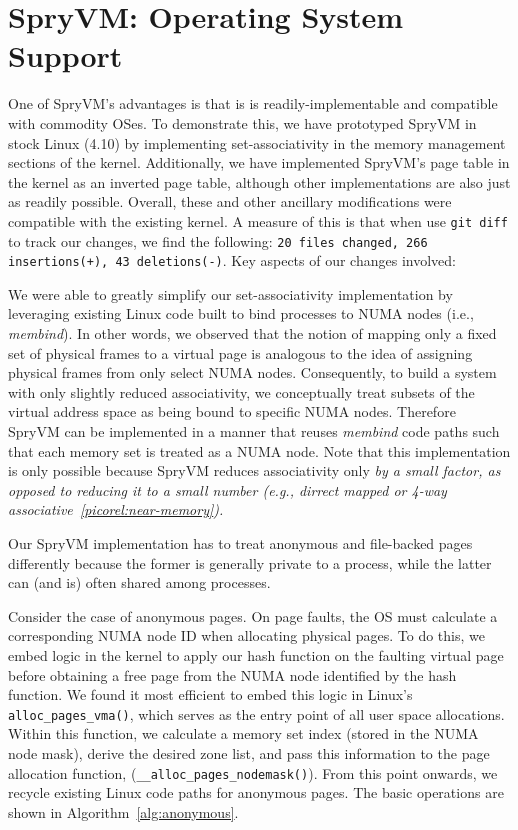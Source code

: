 \section{SpryVM: Operating System Support}
\label{sec:os}

One of SpryVM's advantages is that is is readily-implementable and
compatible with commodity OSes. To demonstrate this, we have
prototyped SpryVM in stock Linux (4.10) by implementing set-associativity in
the memory management sections of the kernel. Additionally, we have
implemented SpryVM's page table in the kernel as an inverted page table,
although other implementations are also just as readily possible. 
Overall, these and other ancillary
modifications were compatible with the existing kernel. A measure of
this is that when use \verb|git diff| to track our changes, we find
the following: \texttt{20 files changed, 266 insertions(+), 43
  deletions(-)}. Key aspects of our changes involved:

\vspace{2mm}
 We were
able to greatly simplify our set-associativity implementation by
leveraging existing Linux code built to bind processes to NUMA nodes
(i.e., {\it membind}). In other words, we observed that the notion of
mapping only a fixed set of physical frames to a virtual page is
analogous to the idea of assigning physical frames from only select
NUMA nodes. Consequently, to build a system with only slightly reduced associativity, 
we conceptually treat subsets of the virtual address space as being bound to specific
NUMA nodes. Therefore SpryVM can be implemented in a manner that
reuses {\it membind} code paths such that each memory set is treated
as a NUMA node. Note that this implementation is only possible because SpryVM
reduces associativity only \it{by a small factor}, as opposed to reducing it
\it{to a small number} (e.g., dirrect mapped or 4-way associative~\ref{picorel:near-memory}). 


\vspace{2mm}
 Our SpryVM
implementation has to treat anonymous and file-backed pages
differently because the former is generally private to a process,
while the latter can (and is) often shared among processes.

Consider the case of anonymous pages. On page faults, the OS
must calculate a corresponding NUMA node ID when allocating physical
pages. To do this, we embed logic in the kernel to apply our hash
function on the faulting virtual page before obtaining a free page
from the NUMA node identified by the hash function. We found it most
efficient to embed this logic in Linux's \verb|alloc_pages_vma()|,
which serves as the entry point of all user space allocations. Within
this function, we calculate a memory set index (stored in the NUMA
node mask), derive the desired zone list, and pass this information to
the page allocation function, (\verb|__alloc_pages_nodemask()|). From
this point onwards, we recycle existing Linux code paths for anonymous
pages. The basic operations are shown in
Algorithm~\ref{alg:anonymous}.

